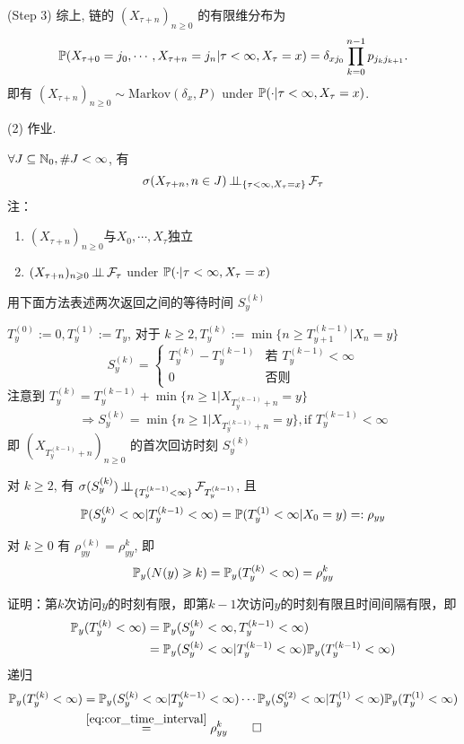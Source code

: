 (Step 3) 综上, 链的 \((X_{\tau + n})_{n \geq 0}\) 的有限维分布为
\[
\mathbb{P}(X_{\tau + 0} = j_0, \cdots, X_{\tau + n} = j_n | \tau < \infty, X_\tau = x) = \delta_{x j_0} \prod_{k=0}^{n-1} p_{j_k j_{k+1}}.
\]
即有 \((X_{\tau + n})_{n \geq 0} \sim \text{Markov}(\delta_x, P)\) under $\mathbb{P}(\cdot|\tau<\infty,X_{\tau}=x)$.

(2) 作业.

\begin{problem}[作业5-3]
$\forall J\subseteq \mathbb{N}_0, \#J<\infty$, 有
\[
\sigma(X_{\tau+n},n\in J)\operatorname{\perp\!\!\!\perp}_{\{\tau<\infty,X_{\tau}=x\}}\mathcal{F}_{\tau}
\]
注：\begin{enumerate}
    \item $(X_{\tau+n})_{n\geq 0}$与$X_0,\cdots,X_{\tau}$独立
    \item $(X_{\tau+n})_{n\geqslant 0}\operatorname{\perp\!\!\!\perp} \mathcal{F}_{\tau}$ under $\mathbb{P}(\cdot|\tau<\infty,X_{\tau}=x)$
\end{enumerate}
\end{problem}

用下面方法表述两次返回之间的等待时间 $S_y^{(k)}$

$T_y^{(0)}:=0, T_y^{(1)}:=T_y$, 对于 $k\geq 2, T_y^{(k)}:=\min\{n\geq T_{y+1}^{(k-1)}|X_n=y\}$
\[
S_y^{(k)}=\begin{cases}
    T_y^{(k)}-T_y^{(k-1)}&\text{若 }T_y^{(k-1)}<\infty\\
    0 & \text{否则}
\end{cases}
\]
注意到 $T_y^{(k)}=T_y^{(k-1)}+\min\{n\geq 1|X_{T_y^{(k-1)}+n}=y\}$
\[
\Rightarrow S_y^{(k)}=\min\{n\geq 1|X_{T_y^{(k-1)}+n}=y\}, \text{if }T_y^{(k-1)}<\infty
\]
即 $(X_{T_y^{(k-1)}+n})_{n\geq 0}$ 的首次回访时刻 $S_y^{(k)}$

\begin{lemma}
    对 $k\geq 2$, 有 $\sigma(S_y^{(k)})\operatorname{\perp\!\!\!\perp}_{\{T_y^{(k-1)}<\infty\}}\mathcal{F}_{T_y^{(k-1)}}$, 且\
    \begin{equation}
\mathbb{P}(S_y^{(k)}<\infty|T_y^{(k-1)}<\infty)=\mathbb{P}(T_y^{(1)}<\infty|X_0=y)=:\rho_{yy}
\label{eq:cor_time_interval}
\end{equation}
\end{lemma}

\begin{corollary}
    对 $k\geq 0$ 有 $\rho_{yy}^{(k)}=\rho_{yy}^k$, 即
    \[
    \mathbb{P}_y(N(y)\geqslant k)=\mathbb{P}_y(T_y^{(k)}<\infty)=\rho_{yy}^k
    \]
\end{corollary}
证明：第$k$次访问$y$的时刻有限，即第$k-1$次访问$y$的时刻有限且时间间隔有限，即
\[
\begin{aligned}
\mathbb{P}_y(T_y^{(k)}<\infty)&=\mathbb{P}_y(S_y^{(k)}<\infty, T_y^{(k-1)}<\infty)\\
&=\mathbb{P}_y(S_y^{(k)}<\infty| T_y^{(k-1)}<\infty)\mathbb{P}_y(T_y^{(k-1)}<\infty)
\end{aligned}
\]
递归
\[
\begin{aligned}
\mathbb{P}_y(T_y^{(k)}<\infty)&=\mathbb{P}_y(S_y^{(k)}<\infty| T_y^{(k-1)}<\infty)\cdots \mathbb{P}_y(S_y^{(2)}<\infty| T_y^{(1)}<\infty)\mathbb{P}_y(T_y^{(1)}<\infty)\\
&\overset{\eqref{eq:cor_time_interval}}{=}\rho_{yy}^k\qed
\end{aligned}
\]

\newpage